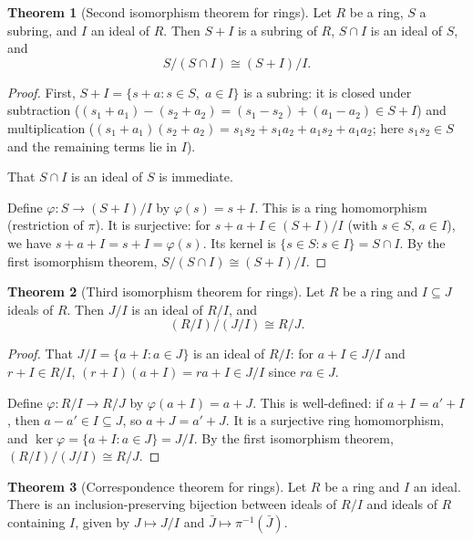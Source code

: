 \documentclass[12pt,a4paper,openany]{book}
\theoremstyle{definition}
\newtheorem{theorem}{Theorem}[chapter]
\theoremstyle{remark}
\begin{document}
\begin{theorem}[Second isomorphism theorem for rings]\label{thm:ring-second-isom}
Let $R$ be a ring, $S$ a subring, and $I$ an ideal of $R$. Then $S+I$ is a subring of $R$, $S\cap I$ is an ideal of $S$, and
\[
    S/(S\cap I) \cong (S+I)/I.
\]
\end{theorem}

\begin{proof}
First, $S+I=\{s+a : s\in S,\;a\in I\}$ is a subring: it is closed under subtraction ($(s_1+a_1)-(s_2+a_2)=(s_1-s_2)+(a_1-a_2)\in S+I$) and multiplication ($(s_1+a_1)(s_2+a_2)=s_1s_2+s_1a_2+a_1s_2+a_1a_2$; here $s_1s_2\in S$ and the remaining terms lie in $I$).

That $S\cap I$ is an ideal of $S$ is immediate.

Define $\varphi\colon S\to(S+I)/I$ by $\varphi(s)=s+I$. This is a ring homomorphism (restriction of $\pi$). It is surjective: for $s+a+I\in(S+I)/I$ (with $s\in S$, $a\in I$), we have $s+a+I=s+I=\varphi(s)$. Its kernel is $\{s\in S : s\in I\}=S\cap I$. By the first isomorphism theorem, $S/(S\cap I)\cong(S+I)/I$.
\end{proof}

\begin{theorem}[Third isomorphism theorem for rings]\label{thm:ring-third-isom}
Let $R$ be a ring and $I\subseteq J$ ideals of $R$. Then $J/I$ is an ideal of $R/I$, and
\[
    (R/I)/(J/I) \cong R/J.
\]
\end{theorem}

\begin{proof}
That $J/I=\{a+I : a\in J\}$ is an ideal of $R/I$: for $a+I\in J/I$ and $r+I\in R/I$, $(r+I)(a+I)=ra+I\in J/I$ since $ra\in J$.

Define $\varphi\colon R/I\to R/J$ by $\varphi(a+I)=a+J$. This is well-defined: if $a+I=a'+I$, then $a-a'\in I\subseteq J$, so $a+J=a'+J$. It is a surjective ring homomorphism, and $\ker\varphi=\{a+I : a\in J\}=J/I$. By the first isomorphism theorem, $(R/I)/(J/I)\cong R/J$.
\end{proof}

\begin{theorem}[Correspondence theorem for rings]\label{thm:ring-correspondence}
Let $R$ be a ring and $I$ an ideal. There is an inclusion-preserving bijection between ideals of $R/I$ and ideals of $R$ containing $I$, given by $J\mapsto J/I$ and $\bar{J}\mapsto\pi^{-1}(\bar{J})$.
\end{theorem}
\end{document}
